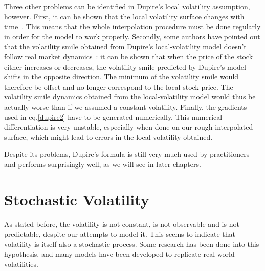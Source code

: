 Three other problems can be identified in Dupire's local volatility assumption, however.
First, it can be shown that the local volatility surface changes with time~\cite{Wilmott}. This means that the whole interpolation procedure must be done regularly in order for the model to work properly.
Secondly, some authors have pointed out that the volatility smile obtained from Dupire's local-volatility model doesn't follow real market dynamics~\cite{Hagan}: it can be shown that when the price of the stock either increases or decreases, the volatility smile predicted by Dupire's model shifts in the opposite direction. The minimum of the volatility smile would therefore be offset and no longer correspond to the local stock price. The volatility smile dynamics obtained from the local-volatility model would thus be actually worse than if we assumed a constant volatility.
Finally, the gradients used in eq.\eqref{dupire2} have to be generated numerically. This numerical differentiation is very unstable, especially when done on our rough interpolated surface, which might lead to errors in the local volatility obtained.

Despite its problems, Dupire's formula is still very much used by practitioners and performs surprisingly well, as we will see in later chapters.



\section{Stochastic Volatility}
\label{section:stochastic volatility}
As stated before, the volatility is not constant, is not observable and is not predictable, despite our attempts to model it. This seems to indicate that volatility is itself also a stochastic process. Some research has been done into this hypothesis, and many models have been developed to replicate real-world volatilities.

